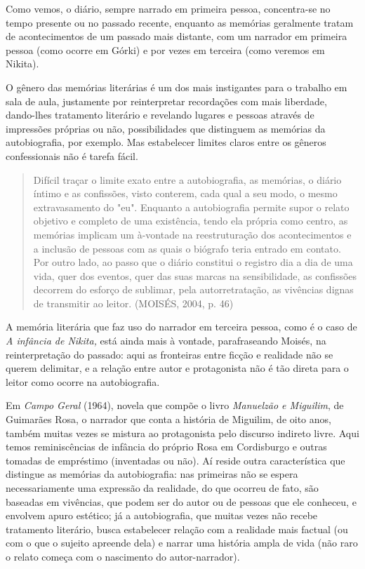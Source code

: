 \documentclass{article}
\begin{document}
Como vemos, o diário, sempre narrado em primeira pessoa, concentra-se no
tempo presente ou no passado recente, enquanto as memórias geralmente
tratam de acontecimentos de um passado mais distante, com um narrador em
primeira pessoa (como ocorre em Górki) e por vezes em terceira (como
veremos em Nikita).

O gênero das memórias literárias é um dos mais instigantes para o
trabalho em sala de aula, justamente por reinterpretar recordações com
mais liberdade, dando-lhes tratamento literário e revelando lugares e
pessoas através de impressões próprias ou não, possibilidades que
distinguem as memórias da autobiografia, por exemplo. Mas estabelecer
limites claros entre os gêneros confessionais não é tarefa fácil.

\begin{quote}
Difícil traçar o limite exato entre a autobiografia, as memórias, o
diário íntimo e as confissões, visto conterem, cada qual a seu modo, o
mesmo extravasamento do "eu". Enquanto a autobiografia permite supor o
relato objetivo e completo de uma existência, tendo ela própria como
centro, as memórias implicam um à-vontade na reestruturação dos
acontecimentos e a inclusão de pessoas com as quais o biógrafo teria
entrado em contato. Por outro lado, ao passo que o diário constitui o
registro dia a dia de uma vida, quer dos eventos, quer das suas marcas
na sensibilidade, as confissões decorrem do esforço de sublimar, pela
autorretratação, as vivências dignas de transmitir ao leitor. (MOISÉS,
2004, p. 46)
\end{quote}

A memória literária que faz uso do narrador em terceira pessoa, como é o
caso de \emph{A infância de Nikita,} está ainda mais à vontade,
parafraseando Moisés, na reinterpretação do passado: aqui as fronteiras
entre ficção e realidade não se querem delimitar, e a relação entre
autor e protagonista não é tão direta para o leitor como ocorre na
autobiografia.

Em \emph{Campo Geral} (1964), novela que compõe o livro \emph{Manuelzão
e Miguilim}, de Guimarães Rosa, o narrador que conta a história de
Miguilim, de oito anos, também muitas vezes se mistura ao protagonista
pelo discurso indireto livre. Aqui temos reminiscências de infância do
próprio Rosa em Cordisburgo e outras tomadas de empréstimo (inventadas
ou não). Aí reside outra característica que distingue as memórias da
autobiografia: nas primeiras não se espera necessariamente uma expressão
da realidade, do que ocorreu de fato, são baseadas em vivências, que
podem ser do autor ou de pessoas que ele conheceu, e envolvem apuro
estético; já a autobiografia, que muitas vezes não recebe tratamento
literário, busca estabelecer relação com a realidade mais factual (ou
com o que o sujeito apreende dela) e narrar uma história ampla de vida
(não raro o relato começa com o nascimento do autor-narrador).
\end{document}
